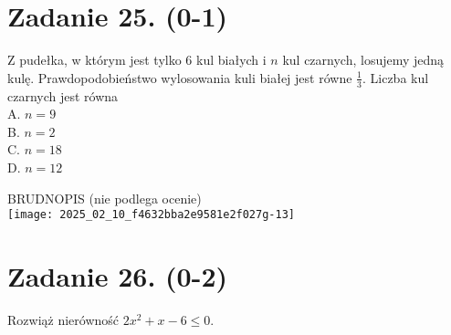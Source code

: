 \documentclass[10pt]{article}
\begin{document}
\section*{Zadanie 25. (0-1)}
Z pudełka, w którym jest tylko 6 kul białych i \(n\) kul czarnych, losujemy jedną kulę. Prawdopodobieństwo wylosowania kuli białej jest równe \(\frac{1}{3}\). Liczba kul czarnych jest równa\\
A. \(n=9\)\\
B. \(n=2\)\\
C. \(n=18\)\\
D. \(n=12\)

BRUDNOPIS (nie podlega ocenie)\\
\texttt{[image: 2025\_02\_10\_f4632bba2e9581e2f027g-13]}

\section*{Zadanie 26. (0-2)}
Rozwiąż nierówność \(2 x^{2}+x-6 \leq 0\).
\end{document}
